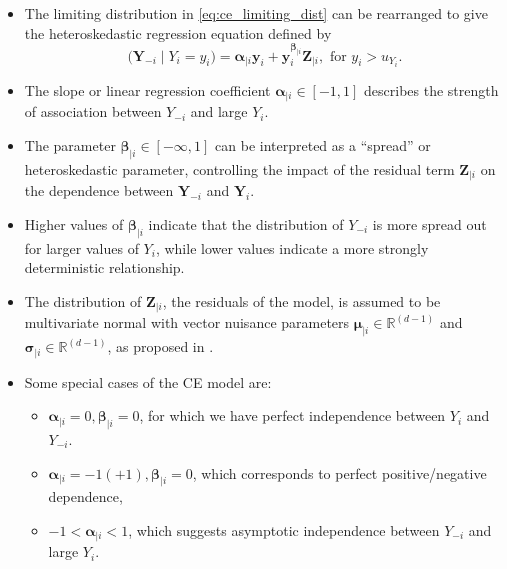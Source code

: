 \documentclass{article}
\numberwithin{equation}{section}
\begin{document}
\vspace{1cm}

\begin{itemize}
  \item The limiting distribution in \eqref{eq:ce_limiting_dist} can be rearranged to give the heteroskedastic regression equation defined by
    \begin{equation} \label{eq:ce_model}
      \bigl(\bm{Y}_{-i} \mid Y_i = y_i \bigr) = \bm{\alpha}_{\mid i}\bm{y}_i + \bm{y}_i^{\bm{\beta}_{\mid i}}\bm{Z}_{\mid i}, \text{ for } y_i > u_{Y_i}.
    \end{equation}
  \item The slope or linear regression coefficient $\bm{\alpha}_{\mid i} \in [-1, 1]$ describes the strength of association between $Y_{-i}$ and large $Y_i$. 
  \item The parameter $\bm{\beta}_{\mid i} \in [-\infty, 1]$ can be interpreted as a ``spread'' or heteroskedastic parameter, controlling the impact of the residual term $\bm{Z}_{\mid i}$ on the dependence between $\bm{Y}_{-i}$ and $\bm{Y}_i$.
  \item Higher values of $\bm{\beta}_{\mid i}$ indicate that the distribution of $Y_{-i}$ is more spread out for larger values of $Y_i$, while lower values indicate a more strongly deterministic relationship. 
  \item The distribution of $\bm{Z}_{\mid i}$, the residuals of the model, is assumed to be multivariate normal with vector nuisance parameters $\bm{\mu}_{\mid i} \in \mathbb{R}^{(d-1)}$ and $\bm{\sigma}_{\mid i} \in \mathbb{R}^{(d-1)}$, as proposed in \citet{Heffernan2004}.
  \item Some special cases of the CE model are:
    \begin{itemize}
      \item $\bm{\alpha}_{\mid i} = 0, \bm{\beta}_{\mid i} = 0$, for which we have perfect independence between $Y_i$ and $Y_{-i}$.
      \item $\bm{\alpha}_{\mid i} = -1(+1), \bm{\beta}_{\mid i} = 0$, which corresponds to perfect positive/negative dependence, 
      \item $-1 < \bm{\alpha}_{\mid i} < 1$, which suggests asymptotic independence between $Y_{-i}$ and large $Y_{i}$.
    \end{itemize}
\end{itemize}
\end{document}
